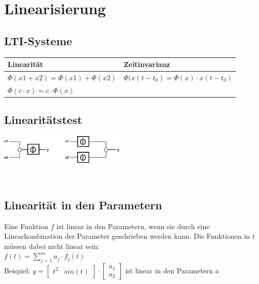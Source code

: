 \section{Linearisierung }
	\begin{minipage}[c]{10cm}
		\subsection{LTI-Systeme }
			\renewcommand{\arraystretch}{1.5}
			\begin{tabular}{|l|l|}
				\hline
				\textbf{Linearität} & \textbf{Zeitinvarianz}\\
				\hline
				$\Phi(x1+x2)=\Phi(x1)+\Phi(x2)$ & $\Phi(x(t-t_0)=\Phi(x)\cdot x(t-t_0)$ \\
				$\Phi(c\cdot x)=c\cdot \Phi(x)$ & \\
				\hline    
			\end{tabular}
			\renewcommand{\arraystretch}{1}
		\end{minipage}
		\begin{minipage}[c]{6cm}
			\subsection{Linearitätstest }
			\includegraphics[width=6cm]{bilder/linearitaetstest}
		\end{minipage} \\
		
		


	\subsection{Linearität in den Parametern}
		Eine Funktion $f$ ist linear in den Parametern, wenn sie durch eine Linearkombination der Parameter geschrieben werden kann. Die Funktionen in $t$ müssen dabei nicht linear sein: \\
		$f(t) = \sum\limits_{j=1}^m a_j \cdot f_j(t)$ \\
		Beispiel: $y = \left[\begin{matrix} t^2 & sin(t) \end{matrix} \right] \cdot \left[\begin{matrix} a_1 \\ a_2 \end{matrix}\right]$ ist linear in den Parametern $a$
	
